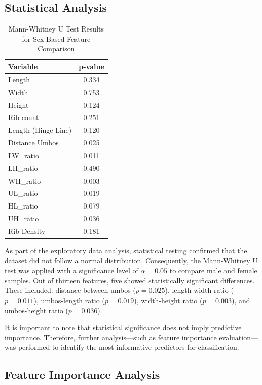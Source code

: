 \subsection{Statistical Analysis}

\begin{table}[H]
	\centering
	\small %
	\begin{tabular}{lc}
		\hline
		\textbf{Variable} & \textbf{p-value} \\ \hline
		Length & 0.334 \\
		Width & 0.753 \\
		Height & 0.124 \\
		Rib count & 0.251 \\
		Length (Hinge Line) & 0.120 \\
		Distance Umbos & 0.025 \\
		LW\_ratio & 0.011 \\
		LH\_ratio & 0.490 \\
		WH\_ratio & 0.003 \\
		UL\_ratio & 0.019 \\
		HL\_ratio & 0.079 \\
		UH\_ratio & 0.036 \\
		Rib Density & 0.181 \\ \hline
	\end{tabular}
	\caption{Mann-Whitney U Test Results for Sex-Based Feature Comparison}
	\label{tab:mann-whitney}
\end{table}

As part of the exploratory data analysis, statistical testing confirmed that the dataset did not follow a normal distribution. Consequently, the Mann-Whitney U test was applied with a significance level of $\alpha = 0.05$ to compare male and female samples. Out of thirteen features, five showed statistically significant differences. These included: distance between umbos ($p = 0.025$), length-width ratio ($p = 0.011$), umbos-length ratio ($p = 0.019$), width-height ratio ($p = 0.003$), and umbos-height ratio ($p = 0.036$). 

It is important to note that statistical significance does not imply predictive importance. Therefore, further analysis—such as feature importance evaluation—was performed to identify the most informative predictors for classification.

\subsection{Feature Importance Analysis}

